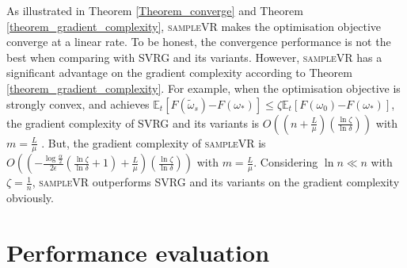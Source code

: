 \documentclass[letterpaper]{article}
\begin{document}
 As illustrated in Theorem \ref{Theorem_converge} and Theorem \ref{theorem_gradient_complexity}, \textsc{sampleVR} makes the optimisation objective converge at a linear rate. To be honest,  the convergence performance is  not the best when comparing with SVRG and its variants. However, \textsc{sampleVR}
 has a significant advantage on the gradient complexity according to Theorem \ref{theorem_gradient_complexity}. For example, when the optimisation objective is strongly convex, and achieves $\mathbb{E}_t[F(\tilde{\omega}_s)\mathrm{-}F(\omega_\ast)] \le \zeta \mathbb{E}_t[F(\omega_0)\mathrm{-}F(\omega_\ast)]$, the gradient complexity of SVRG and its variants is $O\left(\left(n+\frac{L}{\mu}\right)\left( \frac{\ln \zeta}{\ln \delta}\right)\right)$ with $m=\frac{L}{\mu}$ \cite{Allen2015UniVR}. But, the gradient complexity of \textsc{sampleVR}  is $O\left(\left(\mathrm{-} \frac{\log\frac{\alpha}{2}}{2\epsilon} (\frac{\ln \zeta}{\ln \delta}+1)+\frac{L}{\mu} \right )\left( \frac{\ln \zeta}{\ln \delta}\right)  \right)$ with $m=\frac{L}{\mu}$. Considering $\ln n \ll n$ with $\zeta=\frac{1}{n}$, \textsc{sampleVR}  outperforms SVRG and its variants on the gradient complexity obviously.



\section{Performance evaluation}
\label{sect_performance_evaluation}

\end{document}
